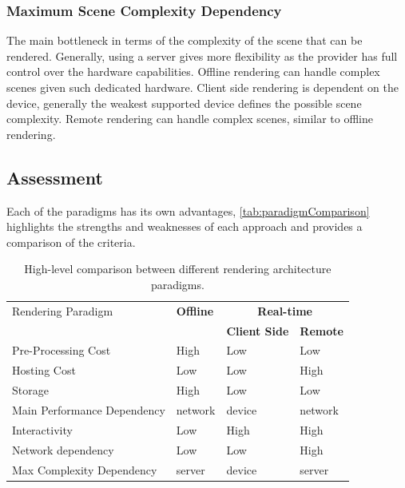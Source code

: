 \subsubsection{Maximum Scene Complexity Dependency}

The main bottleneck in terms of the complexity of the scene that can be rendered. Generally, using a server gives more flexibility as the provider has full control over the hardware capabilities. Offline rendering can handle complex scenes given such dedicated hardware. Client side rendering is dependent on the device, generally the weakest supported device defines the possible scene complexity. Remote rendering can handle complex scenes, similar to offline rendering.

\subsection*{Assessment}
\label{ch:paradigmAssessment}

Each of the paradigms has its own advantages, \autoref{tab:paradigmComparison} highlights the strengths and weaknesses of each approach and provides a comparison of the criteria.

\begin{table}[H]
  \centering
  \begin{tabular}{@{}p{5cm}p{2.5cm}p{2.5cm}p{2.5cm}@{}}
  \toprule
  Rendering Paradigm & \textbf{Offline} & \multicolumn{2}{c}{\textbf{Real-time}} \\
   &  & \textbf{Client Side} & \textbf{Remote} \\
  Pre-Processing Cost & High & Low & Low \\
  Hosting Cost & Low & Low & High \\
  Storage & High & Low & Low \\
  Main Performance Dependency & network & device & network \\
  Interactivity & Low & High & High \\
  Network dependency & Low & Low & High \\
  Max Complexity Dependency & server & device & server \\
  \bottomrule
  \end{tabular}
  \caption{High-level comparison between different rendering architecture paradigms.}
  \label{tab:paradigmComparison}
\end{table}

